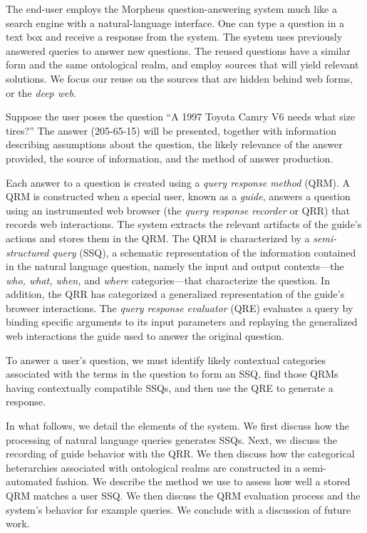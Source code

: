 
The end-user employs the Morpheus question-answering system much like a search engine with a natural-language interface. One can type a question in a text box and receive a response from the system. The system uses previously answered queries to answer new questions.  The reused questions have a similar form and the same ontological realm, and employ sources that will yield relevant solutions.  We focus our reuse on the sources that are hidden behind web forms, or the \emph{deep web}.

Suppose the user poses the question ``A 1997 Toyota Camry V6 needs what size tires?'' The answer (205-65-15) will be presented, together with information describing assumptions about the question, the likely relevance of the answer provided,
the source of information, and the method of answer production.

Each answer to a question is created using a \emph{query response
  method} (QRM). A QRM is constructed when a special user, known as a
\emph{guide}, answers a question using an instrumented web browser (the
\emph{query response recorder} or QRR) that records web
interactions. The system extracts the relevant artifacts of the
guide's actions and stores them in the QRM. The QRM is characterized
by a \emph{semi-structured query} (SSQ), a schematic representation of
the information contained in the natural language question, namely the input and output
contexts---the \emph{who, what, when,} and \emph{where}
categories---that characterize the question.  In addition, the QRR has categorized a generalized representation of the guide's browser
interactions.  The \emph{query response evaluator} (QRE) evaluates a
query by binding specific arguments to its input parameters and
replaying the generalized web interactions the guide used to answer
the original question.

To answer a user's question, we must identify likely contextual
categories associated with the terms in the question to form an SSQ,
find those QRMs having contextually compatible SSQs, and then use the QRE to
generate a response.


In what follows, we detail the elements of the system.  We first
discuss how the processing of natural language queries generates SSQs.
Next, we discuss the recording of guide behavior with the QRR.  We
then discuss how the categorical heterarchies associated with
ontological realms are constructed in a semi-automated fashion.  We
describe the method we use to assess how well a stored QRM matches a
user SSQ.  We then discuss the QRM evaluation process and the
system's behavior for example queries. We conclude with a discussion of
future work.
 
